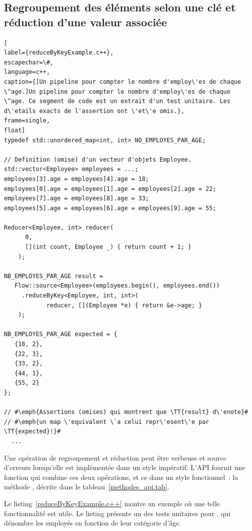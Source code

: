 \subsection{Regroupement des \'el\'ements selon une cl\'e et r\'eduction d'une valeur associ\'ee}

\begin{lstlisting}[
label={reduceByKeyExample.c++},
escapechar=\#,
language=c++,
caption={[Un pipeline pour compter le nombre d'employ\'es de chaque \^age.]Un pipeline pour compter le nombre d'employ\'es de chaque \^age. Ce segment de code est un extrait d'un test unitaire. Les d\'etails exacts de l'assertion ont \'et\'e omis.},
frame=single,
float]
typedef std::unordered_map<int, int> NO_EMPLOYES_PAR_AGE;

// Definition (omise) d'un vecteur d'objets Employee.
std::vector<Employee> employees = ...; 
employees[3].age = employees[4].age = 18;
employees[0].age = employees[1].age = employees[2].age = 22;
employees[7].age = employees[8].age = 33;
employees[5].age = employees[6].age = employees[9].age = 55;

Reducer<Employee, int> reducer(
      0,
      [](int count, Employee _) { return count + 1; }
    );

NB_EMPLOYES_PAR_AGE result = 
   Flow::source<Employee>(employees.begin(), employees.end())
     .reduceByKey<Employee, int, int>(
    		reducer, [](Employee *e) { return &e->age; }
    );
    
NB_EMPLOYES_PAR_AGE expected = {
   {18, 2},
   {22, 3},
   {33, 2},
   {44, 1},
   {55, 2}
};

// #\emph{Assertions (omises) qui montrent que \TT{result} d\'enote}#
// #\emph{un map \'equivalent \`a celui repr\'esent\'e par \TT{expected}!}#
  ...
\end{lstlisting}

Une op\'eration de regroupement et r\'eduction peut \^etre verbeuse et source d'erreurs lorsqu'elle est impl\'ement\'ee dans un style imp\'eratif. L'{API} fournit une fonction qui combine ces deux op\'erations, et ce  dans un style fonctionnel~: la m\'ethode , d\'ecrite dans le tableau~\ref{methodes_api.tab}. 

Le listing~\ref{reduceByKeyExample.c++} montre un exemple o\`u une telle fonctionnalit\'e est utile. Le listing pr\'esente un des tests unitaires pour , qui d\'enombre les employ\'es en fonction de leur cat\'egorie d'\^age. 

